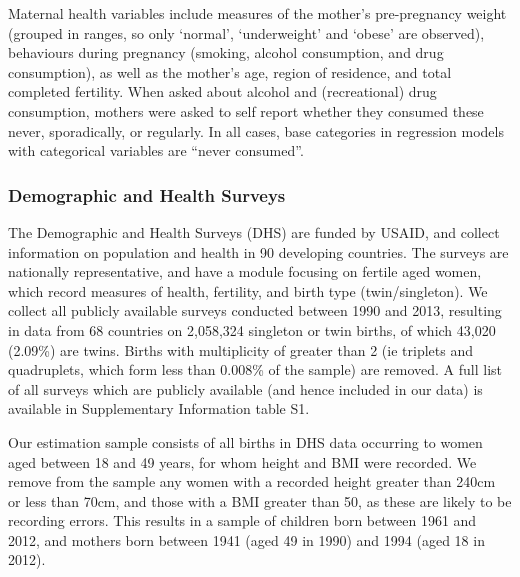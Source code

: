 \documentclass{nature}
\begin{document}
\begin{linenumbers}
Maternal health variables include measures of the mother's pre-pregnancy weight (grouped in ranges, so only `normal', `underweight' and `obese' are observed), behaviours during pregnancy (smoking, alcohol consumption, and drug consumption), as well as the mother's age, region of residence, and total completed fertility.  When asked about alcohol and (recreational) drug consumption, mothers were asked to self report whether they consumed these never, sporadically, or regularly.  In all cases, base categories in regression models with categorical variables are ``never consumed''. %

\subsubsection{Demographic and Health Surveys}
The Demographic and Health Surveys (DHS) are funded by USAID, and collect information on population and health in 90 developing countries.  The surveys are nationally representative, and have a module focusing on fertile aged women, which record measures of health, fertility, and birth type (twin/singleton).  We collect all publicly available surveys conducted between 1990 and 2013, resulting in data from 68 countries on 2,058,324 singleton or twin births, of which 43,020 (2.09\%) are twins.  Births with multiplicity of greater than 2 (ie triplets and quadruplets, which form less than 0.008\% of the sample) are removed.  A full list of all surveys which are publicly available (and hence included in our data) is available in Supplementary Information table S1.

Our estimation sample consists of all births in DHS data occurring to women aged between 18 and 49 years, for whom height and BMI were recorded.  We remove from the sample any women with a recorded height greater than 240cm or less than 70cm, and those with a BMI greater than 50, as these are likely to  be recording errors.  This results in a sample of children born between 1961 and 2012, and mothers born between 1941 (aged 49 in 1990) and 1994 (aged 18 in 2012).  



\end{linenumbers}
\end{document}
